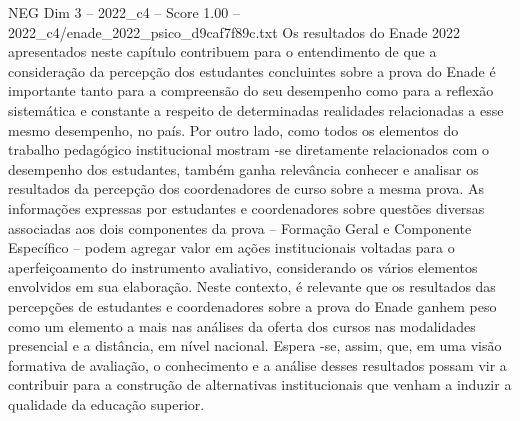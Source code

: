 \begin{textsample}{NEG Dim 3 – 2022\_c4 – Score 1.00 – 2022\_c4/enade\_2022\_psico\_d9caf7f89c.txt}
Os resultados do Enade 2022 apresentados neste capítulo contribuem para o entendimento de que a consideração da percepção dos estudantes concluintes sobre a prova do Enade é importante tanto para a compreensão do seu desempenho como para a reflexão sistemática e constante a respeito de determinadas realidades relacionadas a esse mesmo desempenho, no país.
Por outro lado, como todos os elementos do trabalho pedagógico institucional mostram -se diretamente relacionados com o desempenho dos estudantes, também ganha relevância conhecer e analisar os resultados da percepção dos coordenadores de curso sobre a mesma prova.
As informações expressas por estudantes e coordenadores sobre questões diversas associadas aos dois componentes da prova – Formação Geral e Componente Específico – podem agregar valor em ações institucionais voltadas para o aperfeiçoamento do instrumento avaliativo, considerando os vários elementos envolvidos em sua elaboração.
Neste contexto, é relevante que os resultados das percepções de estudantes e coordenadores sobre a prova do Enade ganhem peso como um elemento a mais nas análises da oferta dos cursos nas modalidades presencial e a distância, em nível nacional.
Espera -se, assim, que, em uma visão formativa de avaliação, o conhecimento e a análise desses resultados possam vir a contribuir para a construção de alternativas institucionais que venham a induzir a qualidade da educação superior.

\end{textsample}
